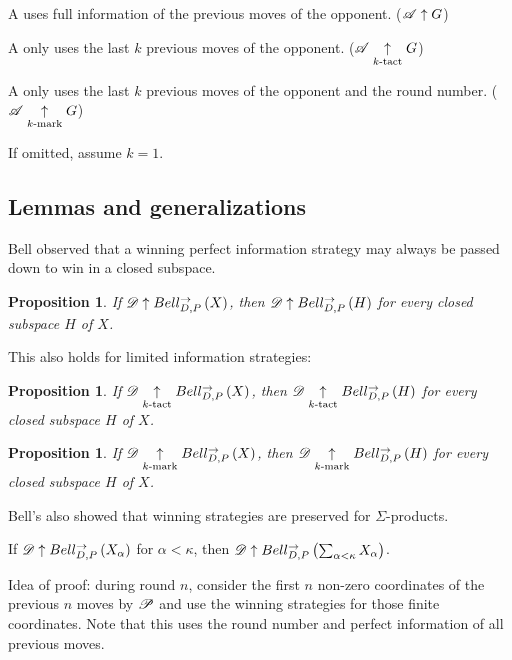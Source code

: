 \documentclass{beamer}
\newtheorem{proposition}[theorem]{Proposition}
\theoremstyle{definition}
\begin{document}
\begin{frame}
  A  uses full information of the
  previous moves of the opponent. ($\mathscr{A}\uparrow G$)

  \vpause
  A  only uses the last $k$
  previous moves of the opponent. ($\mathscr{A}\underset{k\text{-tact}}{\uparrow} G$)

  \vpause
  A  only uses the last $k$
  previous moves of the opponent and the round number.
  ($\mathscr{A}\underset{k\text{-mark}}{\uparrow} G$)

  \vpause
  If omitted, assume $k=1$.
\end{frame}

\subsection{Lemmas and generalizations}

\begin{frame}\small
  Bell observed that a winning perfect information strategy may always
  be passed down to win in a closed subspace.

  \begin{proposition}
    If $\mathscr{D}\uparrow Bell_{D,P}^{\to}\left({X}\right)$, then
    $\mathscr{D}\uparrow Bell_{D,P}^{\to}\left({H}\right)$ for every closed subspace $H$ of $X$.
  \end{proposition}

  \pause

  This also holds for limited information strategies:

  \begin{proposition}
    If $\mathscr{D}\underset{k\text{-tact}}{\uparrow}Bell_{D,P}^{\to}\left({X}\right)$, then
    $\mathscr{D}\underset{k\text{-tact}}{\uparrow}Bell_{D,P}^{\to}\left({H}\right)$ for every closed subspace $H$ of $X$.
  \end{proposition}

  \begin{proposition}
    If $\mathscr{D}\underset{k\text{-mark}}{\uparrow}Bell_{D,P}^{\to}\left({X}\right)$, then
    $\mathscr{D}\underset{k\text{-mark}}{\uparrow}Bell_{D,P}^{\to}\left({H}\right)$ for every closed subspace $H$ of $X$.
  \end{proposition}
\end{frame}

\begin{frame}
  Bell's also showed that winning strategies
  are preserved for $\Sigma$-products.

  \begin{theorem}
    If $\mathscr{D}\uparrow Bell_{D,P}^{\to}\left({X_\alpha}\right)$ for $\alpha<\kappa$, then
    $\mathscr{D}\uparrow Bell_{D,P}^{\to}\left({\sum_{\alpha<\kappa}X_\alpha}\right)$.
  \end{theorem}

  \vpause

  Idea of proof: during round $n$, consider the first $n$ non-zero coordinates
  of the previous $n$ moves by $\mathscr{P}$ and use the winning strategies for
  those finite coordinates. Note that this uses the round number
  and perfect information of all previous moves.

\end{frame}
\end{document}
